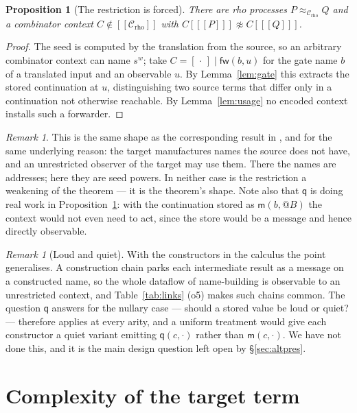 \documentclass[11pt]{article}
\makeatletter
\theoremstyle{plain}
\newtheorem{proposition}[theorem]{Proposition}
\theoremstyle{definition}
\theoremstyle{remark}
\newtheorem{remark}[theorem]{Remark}
\newcommand{\quo}[1]{@#1}
\newcommand{\enc}[1]{[\![#1]\!]}
\newcommand{\Ctx}{\mathscr{C}}
\newcommand{\bisim}{\approx}
\newcommand{\mm}{\mathsf{m}}
\newcommand{\fw}{\mathsf{fw}}
\newcommand{\qq}{\mathsf{q}}
\makeatother
\begin{document}
\begin{proposition}[The restriction is forced]
\label{prop:forced}
There are rho processes $P \bisim_{\Ctx_{\mathrm{rho}}} Q$ and a combinator
context $C \notin \enc{\Ctx_{\mathrm{rho}}}$ with
$C[\enc{P}] \not\bisim C[\enc{Q}]$.
\end{proposition}

\begin{proof}
The seed is computed by the translation from the source, so an arbitrary
combinator context can name $s^{w}$; take $C = [\,\cdot\,] \mid \fw(b,u)$ for
the gate name $b$ of a translated input and an observable $u$. By
Lemma~\ref{lem:gate} this extracts the stored continuation at $u$,
distinguishing two source terms that differ only in a continuation not
otherwise reachable. By Lemma~\ref{lem:usage} no encoded context installs
such a forwarder.
\end{proof}

\begin{remark}
This is the same shape as the corresponding result in \cite{nowns}, and for
the same underlying reason: the target manufactures names the source does not
have, and an unrestricted observer of the target may use them. There the
names are addresses; here they are seed powers. In neither case is the
restriction a weakening of the theorem --- it is the theorem's shape. Note
also that $\qq$ is doing real work in Proposition~\ref{prop:forced}: with the
continuation stored as $\mm(b,\quo{B})$ the context would not even need to
act, since the store would be a message and hence directly observable.
\end{remark}

\begin{remark}[Loud and quiet]
\label{rem:loudquiet}
With the constructors in the calculus the point generalises. A construction chain
parks each intermediate result as a message on a constructed name, so the
whole dataflow of name-building is observable to an unrestricted context, and
Table~\ref{tab:links} (o5) makes such chains common. The question $\qq$
answers for the nullary case --- should a stored value be loud or quiet? ---
therefore applies at every arity, and a uniform treatment would give each
constructor a quiet variant emitting $\qq(c,\cdot)$ rather than
$\mm(c,\cdot)$. We have not done this, and it is the main design question
left open by \S\ref{sec:altpres}.
\end{remark}

\section{Complexity of the target term}
\label{sec:complexity}
\end{document}
